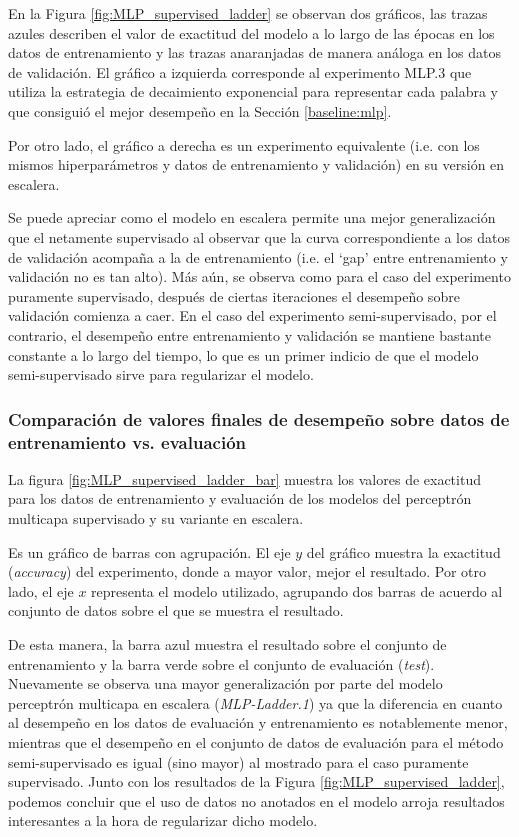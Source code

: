 En la Figura \ref{fig:MLP_supervised_ladder} se observan dos gráficos, las trazas azules describen el valor de
exactitud del modelo a lo largo de las épocas en los datos de entrenamiento y las trazas anaranjadas de manera
análoga en los datos de validación. El gráfico a izquierda corresponde al experimento MLP.3 que utiliza la 
estrategia de decaimiento exponencial para representar cada palabra y que consiguió el mejor desempeño en la 
Sección \ref{baseline:mlp}. 

Por otro lado, el gráfico a derecha es un experimento equivalente (i.e. con los mismos hiperparámetros y datos
de entrenamiento y validación) en su versión en escalera.

Se puede apreciar como el modelo en escalera permite una mejor generalización que el netamente supervisado al 
observar que la curva correspondiente a los datos de validación acompaña a la de entrenamiento (i.e. el `gap' entre entrenamiento y validación no es tan alto). Más aún, se observa como para el caso del experimento 
puramente supervisado, después de ciertas iteraciones el desempeño sobre validación comienza a caer. En el 
caso del experimento semi-supervisado, por el contrario, el desempeño entre entrenamiento y validación se 
mantiene bastante constante a lo largo del tiempo, lo que es un primer indicio de que el modelo 
semi-supervisado sirve para regularizar el modelo.

\subsubsection{Comparación de valores finales de desempeño sobre datos de entrenamiento vs. evaluación}

La figura \ref{fig:MLP_supervised_ladder_bar} muestra los valores de exactitud para los datos de entrenamiento
y evaluación de los modelos del perceptrón multicapa supervisado y su variante en escalera. 

Es un gráfico de barras con agrupación. El eje $y$ del gráfico muestra la exactitud ({\em accuracy}) del 
experimento, donde a mayor valor, mejor el resultado. Por otro lado, el eje $x$ representa el modelo 
utilizado, agrupando dos barras de acuerdo al conjunto de datos sobre el que se muestra el resultado. 

De esta manera, la barra azul muestra el resultado sobre el conjunto de entrenamiento y la barra verde sobre 
el conjunto de evaluación ({\em test}). Nuevamente se observa una mayor generalización por parte del modelo 
perceptrón multicapa en escalera ({\em MLP-Ladder.1}) ya que la diferencia en cuanto al desempeño en los datos
de evaluación y entrenamiento es notablemente menor, mientras que el desempeño en el conjunto de datos de 
evaluación para el método semi-supervisado es igual (sino mayor) al mostrado para el caso puramente 
supervisado. Junto con los resultados de la Figura \ref{fig:MLP_supervised_ladder}, podemos concluir que
el uso de datos no anotados en el modelo arroja resultados interesantes a la hora de regularizar dicho
modelo.

